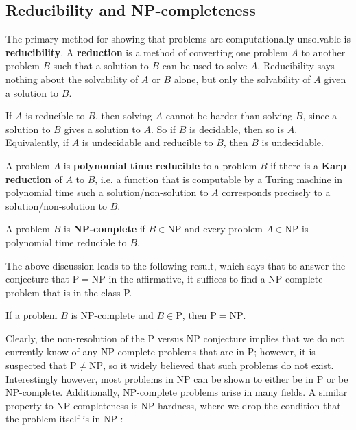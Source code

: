\subsection{Reducibility and NP-completeness}

The primary method for showing that problems are computationally unsolvable is \textbf{reducibility}. A \textbf{reduction} is a method of converting one problem $A$ to another problem $B$ such that a solution to $B$ can be used to solve $A$. Reducibility says nothing about the solvability of $A$ or $B$ alone, but only the solvability of $A$ given a solution to $B$. 

If $A$ is reducible to $B$, then solving $A$ cannot be harder than solving $B$, since a solution to $B$ gives a solution to $A$. So if $B$ is decidable, then so is $A$. Equivalently, if $A$ is undecidable and reducible to $B$, then $B$ is undecidable.

\begin{definition}\label{def:Karp_reduction}
    A problem $A$ is \textbf{polynomial time reducible} to a problem $B$ if there is a \textbf{Karp reduction} of $A$ to $B$, i.e. a function that is computable by a Turing machine in polynomial time such a solution/non-solution to $A$ corresponds precisely to a solution/non-solution to $B$.
\end{definition}

\begin{definition}\label{def:NP_complete}
    A problem $B$ is \textbf{NP-complete} if $B \in \mathrm{NP}$ and every problem $A \in \mathrm{NP}$ is polynomial time reducible to $B$.
\end{definition}

The above discussion leads to the following result, which says that to answer the conjecture that $\mathrm{P} = \mathrm{NP}$ in the affirmative, it suffices to find a NP-complete problem that is in the class P.

\begin{theorem}\label{thm:NP_complete_P_vs_NP}
    If a problem $B$ is NP-complete and $B \in \mathrm{P}$, then $\mathrm{P} = \mathrm{NP}$. \qedhere
\end{theorem}

Clearly, the non-resolution of the P versus NP conjecture implies that we do not currently know of any NP-complete problems that are in P; however, it is suspected that $\mathrm{P} \neq \mathrm{NP}$, so it widely believed that such problems do not exist. Interestingly however,  most problems in NP can be shown to either be in P or be NP-complete. Additionally, NP-complete problems arise in many fields. A similar property to NP-completeness is NP-hardness, where we drop the condition that the problem itself is in NP :

